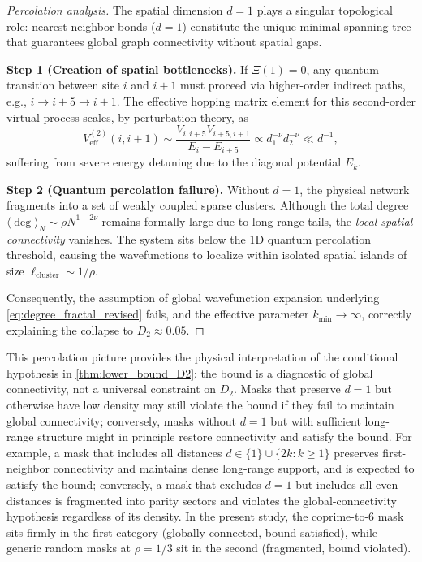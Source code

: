 \documentclass[11pt,a4paper]{article}
\begin{document}
\begin{proof}[Percolation analysis]
The spatial dimension $d=1$ plays a singular topological role: nearest-neighbor bonds ($d=1$) constitute the unique minimal spanning tree that guarantees global graph connectivity without spatial gaps.

\textbf{Step 1 (Creation of spatial bottlenecks).} If $\Xi(1) = 0$, any quantum transition between site $i$ and $i+1$ must proceed via higher-order indirect paths, e.g., $i \to i+5 \to i+1$. The effective hopping matrix element for this second-order virtual process scales, by perturbation theory, as
\begin{equation}
V_{\text{eff}}^{(2)}(i, i+1) \sim \frac{V_{i, i+5} V_{i+5, i+1}}{E_i - E_{i+5}} \propto d_1^{-\nu} d_2^{-\nu} \ll d^{-1},
\end{equation}
suffering from severe energy detuning due to the diagonal potential $E_k$.

\textbf{Step 2 (Quantum percolation failure).} Without $d=1$, the physical network fragments into a set of weakly coupled sparse clusters. Although the total degree $\langle \deg \rangle_N \sim \rho N^{1-2\nu}$ remains formally large due to long-range tails, the \emph{local spatial connectivity} vanishes. The system sits below the 1D quantum percolation threshold, causing the wavefunctions to localize within isolated spatial islands of size $\ell_{\text{cluster}} \sim 1/\rho$.

Consequently, the assumption of global wavefunction expansion underlying \cref{eq:degree_fractal_revised} fails, and the effective parameter $k_{\min} \to \infty$, correctly explaining the collapse to $D_2 \approx 0.05$.
\end{proof}

This percolation picture provides the physical interpretation of the conditional hypothesis in \cref{thm:lower_bound_D2}: the bound is a diagnostic of global connectivity, not a universal constraint on $D_2$. Masks that preserve $d=1$ but otherwise have low density may still violate the bound if they fail to maintain global connectivity; conversely, masks without $d=1$ but with sufficient long-range structure might in principle restore connectivity and satisfy the bound. For example, a mask that includes all distances $d \in \{1\} \cup \{2k : k \geq 1\}$
preserves first-neighbor connectivity and maintains dense long-range
support, and is expected to satisfy the bound; conversely, a mask that
excludes $d=1$ but includes all even distances is fragmented into parity
sectors and violates the global-connectivity hypothesis regardless of its
density. In the present study, the coprime-to-6 mask sits firmly in the first category (globally connected, bound satisfied), while generic random masks at $\rho = 1/3$ sit in the second (fragmented, bound violated).



\end{document}
